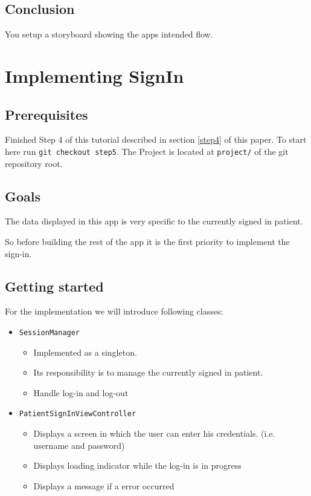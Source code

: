 \documentclass{article}
\begin{document}
\subsection{Conclusion}\label{step4:conclusion}

You setup a storyboard showing the apps intended flow.

\section{Implementing SignIn}\label{step5}

\subsection{Prerequisites}\label{step5:prerequisites}
Finished Step 4 of this tutorial described in section \ref{step4} of this paper.
To start here run \texttt{git checkout step5}.
The Project is located at \texttt{project/} of the git repository root.

\subsection{Goals}\label{step5:goals}

The data displayed in this app is very specific to the currently signed
in patient.

So before building the rest of the app it is the first priority to
implement the sign-in.

\subsection{Getting started}\label{step5:getting-started}

For the implementation we will introduce following classes:

\begin{itemize}

\item
  \texttt{SessionManager}
    \begin{itemize}

    \item
      Implemented as a singleton.
    \item
      Its responsibility is to manage the currently signed in patient.
    \item
      Handle log-in and log-out
    \end{itemize}

\item
  \texttt{PatientSignInViewController}
    \begin{itemize}

    \item
      Displays a screen in which the user can enter his credentials.
      (i.e. username and password)
    \item
      Displays loading indicator while the log-in is in progress
    \item
      Displays a message if a error occurred
    \end{itemize}
\end{itemize}
\end{document}
